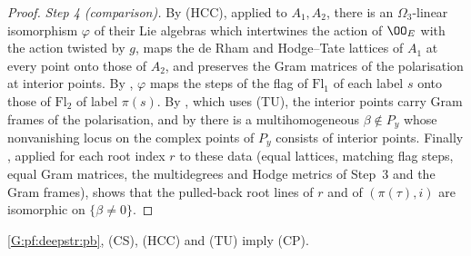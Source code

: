 \begin{proof}
\emph{Step 4 (comparison).} By (HCC), applied to $A_1,A_2$, there is an $\Omega_3$-linear isomorphism $\varphi$ of their Lie
algebras which intertwines the action of $\OO_E$ with the action twisted by $g$, maps the de Rham and Hodge--Tate lattices of
$A_1$ at every point onto those of $A_2$, and preserves the Gram matrices of the polarisation at interior points. By
, $\varphi$ maps the steps of the flag of $\mathrm{Fl}_1$ of each label $s$ onto
those of $\mathrm{Fl}_2$ of label $\pi(s)$. By , which uses (TU),
the interior points carry Gram frames of the polarisation, and by  there is
a multihomogeneous $\beta\notin P_y$ whose nonvanishing locus on the complex points of $P_y$ consists of interior points.
Finally , applied for each root index $r$ to these data (equal lattices,
matching flag steps, equal Gram matrices, the multidegrees and Hodge metrics of Step~3 and the Gram frames), shows that the
pulled-back root lines of $r$ and of $(\pi(\tau),i)$ are isomorphic on $\{\beta\ne0\}$.
\end{proof}

\begin{theorem}\label{pf:tower:cp}
\ref{G:pf:deepstr:pb}, \textup{(CS)}, \textup{(HCC)} and \textup{(TU)} imply \textup{(CP)}.
\end{theorem}

